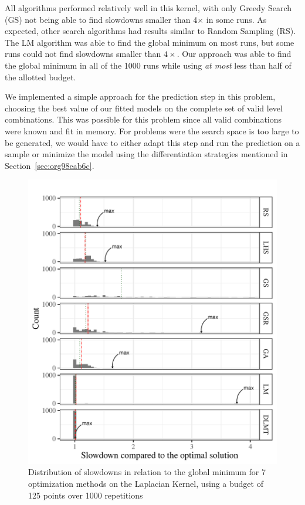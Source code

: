 \documentclass[conference]{IEEEtran}
\begin{document}
All algorithms performed relatively well in this kernel, with only Greedy Search
(GS) not being able to find slowdowns smaller than 4\(\times\) in some runs. As
expected, other search algorithms had results similar to Random Sampling (RS).
The LM algorithm was able to find the global minimum on most runs, but some runs
could not find slowdowns smaller than \(4\times\). Our approach was able to find
the global minimum in all of the 1000 runs while using \emph{at most} less than half
of the allotted budget.

We implemented a simple approach for the prediction step in this problem,
choosing the best value of our fitted models on the complete set of valid level
combinations. This was possible for this problem since all valid combinations
were known and fit in memory. For problems were the search space is too large to
be generated, we would have to either adapt this step and run the prediction on
a sample or minimize the model using the differentiation strategies mentioned
in Section~\ref{sec:org98eab6c}.

\begin{figure}[t]\vspace{-.5cm}
\centering
\includegraphics[width=.9\columnwidth]{./img/comparison_histogram.pdf}
\caption{\label{fig:orgdc66fd4}
Distribution of slowdowns in relation to the global minimum for 7 optimization methods on the Laplacian Kernel, using a budget of 125 points over 1000 repetitions \vspace{-.5cm}}
\end{figure}
\end{document}
